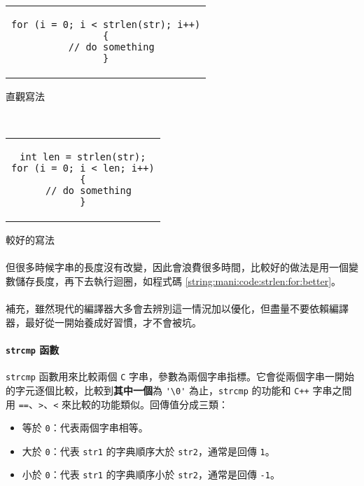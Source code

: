 \documentclass[12pt,a4paper,oneside]{article}
\begin{document}
\begin{CJK}{UTF8}{bkai}
\begin{code}[h!]
  \centering
  \begin{subcode}{.58\textwidth}
    \centering
    \begin{tabular}{c}
    \begin{lstlisting}
for (i = 0; i < strlen(str); i++)
{
  // do something
}
    \end{lstlisting}
    \end{tabular}
    \caption{直觀寫法}
    \label{string:mani:code:strlen:for:naive}
  \end{subcode}
  ~
  \begin{subcode}{.38\textwidth}
    \centering
    \begin{tabular}{c}
    \begin{lstlisting}
int len = strlen(str);
for (i = 0; i < len; i++)
{
  // do something
}
    \end{lstlisting}
    \end{tabular}
    \caption{較好的寫法}
    \label{string:mani:code:strlen:for:better}
  \end{subcode}
  \caption{注意 \lstinline!strlen! 的用法}
  \label{string:mani:code:strlen:for}
\end{code}

\paragraph{}但很多時候字串的長度沒有改變，因此會浪費很多時間，比較好的做法是用一個變數儲存長度，再下去執行迴圈，如程式碼 \ref{string:mani:code:strlen:for:better}。
\paragraph{}補充，雖然現代的編譯器大多會去辨別這一情況加以優化，但盡量不要依賴編譯器，最好從一開始養成好習慣，才不會被坑。

\paragraph{\lstinline!strcmp! 函數}\lstinline!strcmp! 函數用來比較兩個 \texttt{C} 字串，參數為兩個字串指標。它會從兩個字串一開始的字元逐個比較，比較到\textbf{其中一個}為 \lstinline!'\0'! 為止，\lstinline!strcmp! 的功能和 \texttt{C++} 字串之間用 \lstinline!==!、\lstinline!>!、\lstinline!<! 來比較的功能類似。回傳值分成三類：

\begin{itemize}
\item 等於 \lstinline!0!：代表兩個字串相等。
\item 大於 \lstinline!0!：代表 \lstinline!str1! 的字典順序大於 \lstinline!str2!，通常是回傳 \lstinline!1!。
\item 小於 \lstinline!0!：代表 \lstinline!str1! 的字典順序小於 \lstinline!str2!，通常是回傳 \lstinline!-1!。
\end{itemize}


\end{CJK}
\end{document}
